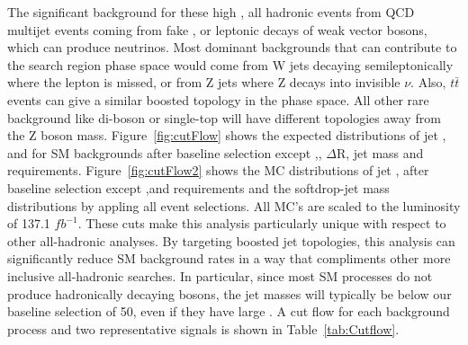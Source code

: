 The significant background for these high \MET, all hadronic events from QCD multijet events coming from fake \MET , or leptonic decays of weak vector bosons, which can produce neutrinos.  Most dominant backgrounds that can contribute to the search region phase space would come from W jets decaying semileptonically where the lepton is missed, or from Z jets where Z decays into invisible $\nu$. Also, $t\bar{t}$ events can give a similar boosted topology in the phase space. All other rare background like di-boson or single-top will have different topologies away from the Z boson mass.
Figure~\ref{fig:cutFlow} shows the expected distributions of jet \pt, \HT and \MET for SM backgrounds after baseline selection except \HT,\MET, $\Delta$R, jet mass and \pt requirements.
Figure~\ref{fig:cutFlow2} shows the MC distributions of jet \pt, after baseline selection except \pt,\HT and \MET requirements and the softdrop-jet mass distributions
by appling all event selections. All MC's are scaled to the luminosity of 137.1 $fb^{-1}$.
These cuts make this analysis particularly unique with respect to other all-hadronic analyses.  
By targeting boosted jet topologies, this analysis can significantly reduce SM background rates in a way that compliments 
other more inclusive all-hadronic searches.  In particular, since most SM processes do not produce hadronically
decaying bosons, the jet masses will typically be below our baseline selection of 50\gev, even if they have large \pt.  
A cut flow for each background process and two representative signals is shown in Table~\ref{tab:Cutflow}.

